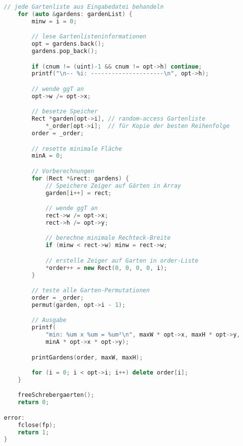 \documentclass[a4paper,10pt,ngerman]{scrartcl}
\begin{document}
\begin{lstlisting}[language=C++]
    // jede Gartenliste aus Eingabedatei behandeln
    for (auto &gardens: gardenList) {
        minw = i = 0;

        // lese Gartenlisteninformationen
        opt = gardens.back();
        gardens.pop_back();

        if (cnum != (uint)-1 && cnum != opt->h) continue;
        printf("\n-- %i: ---------------------\n", opt->h);

        // wende ggT an
        opt->w /= opt->x;

        // besetze Speicher
        Rect *garden[opt->i], // random-access Gartenliste
            *_order[opt->i];  // für Kopie der besten Reihenfolge
        order = _order;

        // resette minimale Fläche
        minA = 0;

        // Vorberechnungen
        for (Rect *&rect: gardens) {
            // Speichere Zeiger auf Gärten in Array
            garden[i++] = rect;

            // wende ggT an
            rect->w /= opt->x;
            rect->h /= opt->y;

            // berechne minimale Rechteck-Breite
            if (minw < rect->w) minw = rect->w;

            // erstelle Zeiger auf Garten in order-Liste
            *order++ = new Rect(0, 0, 0, 0, i);
        }

        // teste alle Garten-Permutationen
        order = _order;
        permut(garden, opt->i - 1);

        // Ausgabe
        printf(
            "min: %um x %um = %um²\n", maxW * opt->x, maxH * opt->y,
            minA * opt->x * opt->y);

        printGardens(order, maxW, maxH);

        for (i = 0; i < opt->i; i++) delete order[i];
    }

    freeSchrebergaerten();
    return 0;

error:
    fclose(fp);
    return 1;
}


\end{lstlisting}
\end{document}
